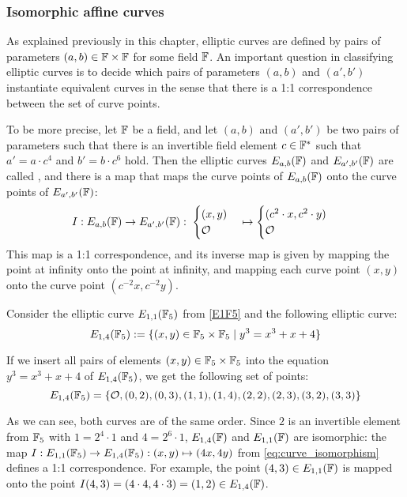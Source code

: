 \subsubsection{Isomorphic affine  curves}
\label{sec:isomorphic_curves} As explained previously in this chapter, elliptic curves are defined by pairs of parameters $(a, b)\in \mathbb{F}\times \mathbb{F}$ for some field $\mathbb{F}$. An important question in classifying elliptic curves is to decide which pairs of parameters $(a,b)$ and $(a',b')$ instantiate equivalent curves in the sense that there is a 1:1 correspondence between the set of curve points.

To be more precise, let $\mathbb{F}$ be a field, and let $(a,b)$ and $(a',b')$ be two pairs of parameters such that there is an invertible field element $c\in \mathbb{F}^*$ such that $a' = a\cdot c^4$ and $b' = b\cdot c^6$ hold. Then the elliptic curves $E_{a,b}(\mathbb{F})$ and $E_{a',b'}(\mathbb{F})$ are called , and there is a map that maps the curve points of $E_{a,b}(\mathbb{F})$ onto the curve points of $E_{a',b'}(\mathbb{F})$:
\begin{equation}
\label{eq:curve_isomorphism}
I: E_{a,b}(\mathbb{F}) \to E_{a',b'}(\mathbb{F}):\; \begin{cases}(x,y)\\\mathcal{O}\end{cases}
\mapsto \begin{cases}(c^2\cdot x,c^2\cdot y)\\\mathcal{O}\end{cases}
\end{equation}
This map is a 1:1 correspondence, and its inverse map is given by mapping the point at infinity onto the point at infinity, and mapping each curve point $(x,y)$ onto the curve point $(c^{-2}x,c^{-2}y)$.
\begin{example}
\label{ex:isomorphic_E1F5}
 Consider the  elliptic curve $E_{1,1}(\mathbb{F}_5)$ from \examplename{} \ref{E1F5} and the following elliptic curve:
\begin{equation}
E_{1,4}(\mathbb{F}_5):= \{(x,y)\in \mathbb{F}_5\times \mathbb{F}_5 \; | \; y^3 = x^3 + x + 4 \}
\end{equation}

If we insert all pairs of elements $(x,y)\in \mathbb{F}_5\times \mathbb{F}_5$ into the  equation $y^3 = x^3 + x + 4$ of $E_{1,4}(\mathbb{F}_5)$, we get the following set of points:
\begin{equation}
E_{1,4}(\mathbb{F}_5) = \{
\mathcal{O}, (0,2), (0,3), (1,1), (1,4), (2,2), (2,3), (3,2), (3,3)\}
\end{equation}

As we can see, both curves are of the same order. Since $2$ is an invertible element from $\mathbb{F}_5$ with $1 = 2^4\cdot 1$ and $4=2^6\cdot 1$, $E_{1,4}(\mathbb{F})$ and $E_{1,1}(\mathbb{F})$ are isomorphic: the map $I: E_{1,1}(\mathbb{F}_5)\to E_{1,4}(\mathbb{F}_5): (x,y)\mapsto (4x,4y)$ from \ref{eq:curve_isomorphism} defines a 1:1 correspondence. For example, the point $(4,3)\in E_{1,1}(\mathbb{F})$ is mapped onto the point $I(4,3)=(4\cdot 4, 4\cdot 3) = (1,2)\in E_{1,4}(\mathbb{F})$.
\end{example}
  
